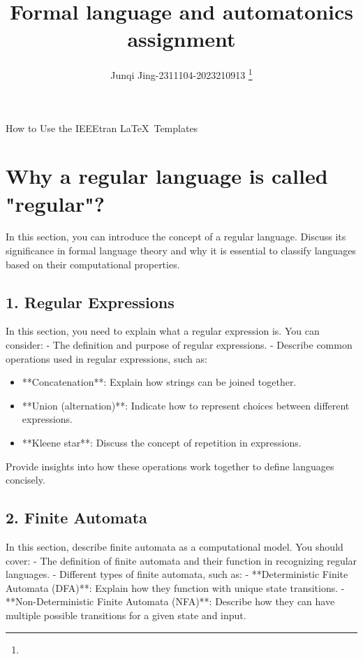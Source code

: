 \documentclass[lettersize,journal]{IEEEtran}
\begin{document}
\title{Formal language and automatonics assignment}
\author{Junqi Jing-2311104-2023210913
\thanks{}}

%
{How to Use the IEEEtran \LaTeX \ Templates}

\maketitle

\section{\textbf{Why a regular language is called "regular"?}}
In this section, you can introduce the concept of a regular language. Discuss its significance in formal language theory and why it is essential to classify languages based on their computational properties.

\subsection*{1. Regular Expressions}

In this section, you need to explain what a regular expression is. You can consider:
- The definition and purpose of regular expressions.
- Describe common operations used in regular expressions, such as:

\begin{itemize}
    \item **Concatenation**: Explain how strings can be joined together.
    \item **Union (alternation)**: Indicate how to represent choices between different expressions.
    \item **Kleene star**: Discuss the concept of repetition in expressions.
\end{itemize}

Provide insights into how these operations work together to define languages concisely.
\subsection*{2. Finite Automata}

In this section, describe finite automata as a computational model. You should cover:
- The definition of finite automata and their function in recognizing regular languages.
- Different types of finite automata, such as:
  - **Deterministic Finite Automata (DFA)**: Explain how they function with unique state transitions.
  - **Non-Deterministic Finite Automata (NFA)**: Describe how they can have multiple possible transitions for a given state and input.
\end{document}
